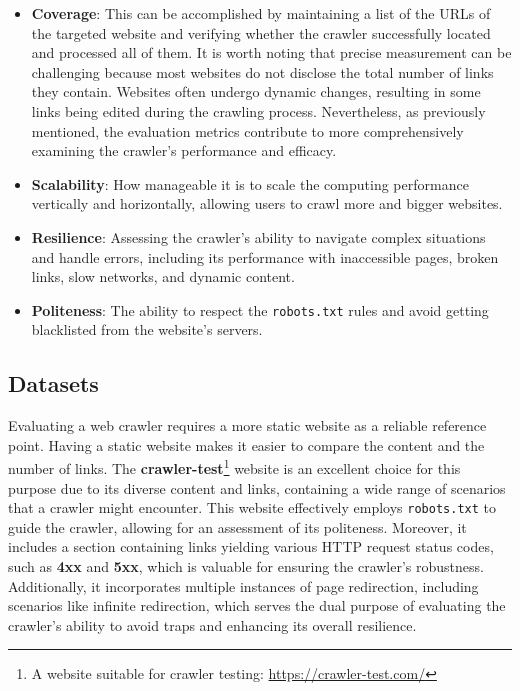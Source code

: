{\renewcommand\labelitemi{}
\begin{itemize}
    \item \textbf{Coverage}: This can be accomplished by maintaining a list of the URLs of the targeted website and verifying whether the crawler successfully located and processed all of them. It is worth noting that precise measurement can be challenging because most websites do not disclose the total number of links they contain. Websites often undergo dynamic changes, resulting in some links being edited during the crawling process. Nevertheless, as previously mentioned, the evaluation metrics contribute to more comprehensively examining the crawler's performance and efficacy.

    \item \textbf{Scalability}: How manageable it is to scale the computing performance vertically and horizontally, allowing users to crawl more and bigger websites. 

    \item \textbf{Resilience}: Assessing the crawler's ability to navigate complex situations and handle errors, including its performance with inaccessible pages, broken links, slow networks, and dynamic content.

    \item \textbf{Politeness}:  The ability to respect the \texttt{robots.txt} rules and avoid getting blacklisted from the website's servers.

\end{itemize}

\subsection{Datasets} 
Evaluating a web crawler requires a more static website as a reliable reference point. Having a static website makes it easier to compare the content and the number of links. The \textbf{crawler-test}\footnote{A website suitable for crawler testing: \url{https://crawler-test.com/}} website is an excellent choice for this purpose due to its diverse content and links, containing a wide range of scenarios that a crawler might encounter. This website effectively employs \texttt{robots.txt} to guide the crawler, allowing for an assessment of its politeness. Moreover, it includes a section containing links yielding various HTTP request status codes, such as \textbf{4xx} and \textbf{5xx}, which is valuable for ensuring the crawler's robustness. Additionally, it incorporates multiple instances of page redirection, including scenarios like infinite redirection, which serves the dual purpose of evaluating the crawler's ability to avoid traps and enhancing its overall resilience.


}
